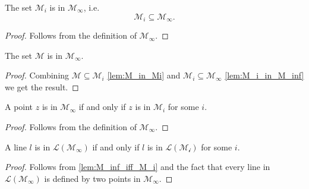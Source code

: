 \begin{lemma}
    \label{lem:M_i_in_M_inf}
    \leanok
    The set $\mathcal{M}_i$ is in $\mathcal{M}_{\infty}$, i.e. $$\mathcal{M}_i \subseteq \mathcal{M}_{\infty}.$$
\end{lemma}
\begin{proof}
    \leanok
    Follows from the definition of $\mathcal{M}_{\infty}$.
\end{proof}

\begin{lemma}
    \label{lem:M_in_M_inf}
    \leanok
    The set $\mathcal{M}$ is in $\mathcal{M}_{\infty}$.
\end{lemma}
\begin{proof}
    \leanok
    Combining $\mathcal{M} \subseteq \mathcal{M}_i$ \ref{lem:M_in_Mi} and $\mathcal{M}_i \subseteq \mathcal{M}_{\infty}$ \ref{lem:M_i_in_M_inf} we get the result.
\end{proof}

\begin{lemma}
    \label{lem:M_inf_iff_M_i}
    \leanok
    A point $z$ is in $\mathcal{M}_{\infty}$ if and only if $z$ is in $\mathcal{M}_i$ for some $i$.
\end{lemma}
\begin{proof}
    \leanok
    Follows from the definition of $\mathcal{M}_{\infty}$.
\end{proof}

\begin{corollary}
    \label{cor:L_M_inf_iff_L_M_i}
    \leanok
    A line $l$ is in $\mathcal{L(M_{\infty})}$ if and only if $l$ is in $\mathcal{L(M_i)}$ for some $i$.
\end{corollary}
\begin{proof}
    \leanok
    Follows from \ref{lem:M_inf_iff_M_i} and the fact that every line in $\mathcal{L(M_{\infty})}$ is defined by two points in $\mathcal{M_{\infty}}$.
\end{proof}

